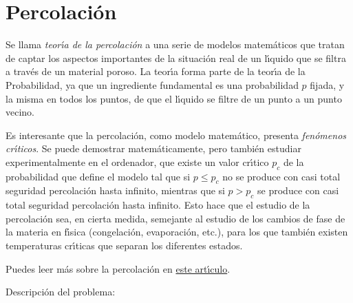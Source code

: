 \section{Percolaci\'on}



Se llama {\itshape teor\'{\i}a de la percolaci\'on} a una serie de modelos 
matem\'aticos que tratan de captar los aspectos importantes de la situaci\'on 
real de un l\'{\i}quido que se filtra a trav\'es de un material poroso. La 
teor\'{\i}a forma parte de la teor\'{\i}a de la Probabilidad, ya que un 
ingrediente fundamental es una probabilidad $p$ fijada, y la misma en todos los 
puntos,  de que  el l\'{\i}quido se filtre de un punto a un punto vecino. 


Es interesante que la percolaci\'on, como modelo matem\'atico, presenta 
{\itshape fen\'omenos cr\'{\i}ticos}. Se puede demostrar matem\'aticamente, 
pero tambi\'en estudiar experimentalmente en el ordenador, que existe un valor 
cr\'{\i}tico $p_c$ de la probabilidad que define el modelo tal que si $p\le 
p_c$ no se produce con casi total seguridad percolaci\'on hasta infinito, 
mientras que si $p>p_c$ se produce con casi total seguridad percolaci\'on hasta 
infinito. Esto hace que el estudio de la percolaci\'on sea, en cierta medida, 
semejante al estudio de los cambios de fase de la materia en f\'{\i}sica 
(congelaci\'on, evaporaci\'on, etc.), para los que tambi\'en existen 
temperaturas cr\'{\i}ticas que separan los diferentes estados. 

Puedes leer m\'as sobre la percolaci\'on  en
\href{http://150.244.21.37/PDFs/MISCE/percolation.pdf}{este art\'{\i}culo}.
\par
\bigskip
\par
{\sc Descripci\'on del problema:}


